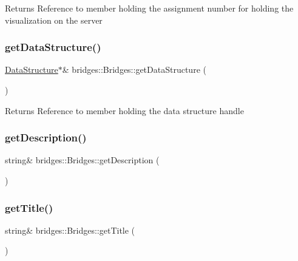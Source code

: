 \begin{DoxyReturn}{Returns}
Reference to member holding the assignment number for holding the visualization on the server 
\end{DoxyReturn}
\hypertarget{namespacebridges_1_1_bridges_ad6eacdcf477c8f781482068f79632fd6}{}\label{namespacebridges_1_1_bridges_ad6eacdcf477c8f781482068f79632fd6} 
\subsubsection{\texorpdfstring{get\+Data\+Structure()}{getDataStructure()}}
{\footnotesize\ttfamily \hyperlink{classbridges_1_1_data_structure}{Data\+Structure}$\ast$\& bridges\+::\+Bridges\+::get\+Data\+Structure (\begin{DoxyParamCaption}{ }\end{DoxyParamCaption})}

\begin{DoxyReturn}{Returns}
Reference to member holding the data structure handle 
\end{DoxyReturn}
\hypertarget{namespacebridges_1_1_bridges_ac1475b5f38d5d8ad435df8f865f2d55b}{}\label{namespacebridges_1_1_bridges_ac1475b5f38d5d8ad435df8f865f2d55b} 
\subsubsection{\texorpdfstring{get\+Description()}{getDescription()}}
{\footnotesize\ttfamily string\& bridges\+::\+Bridges\+::get\+Description (\begin{DoxyParamCaption}{ }\end{DoxyParamCaption})}

\hypertarget{namespacebridges_1_1_bridges_acc332b802bfcede5a9ce257037b57043}{}\label{namespacebridges_1_1_bridges_acc332b802bfcede5a9ce257037b57043} 
\subsubsection{\texorpdfstring{get\+Title()}{getTitle()}}
{\footnotesize\ttfamily string\& bridges\+::\+Bridges\+::get\+Title (\begin{DoxyParamCaption}{ }\end{DoxyParamCaption})}

